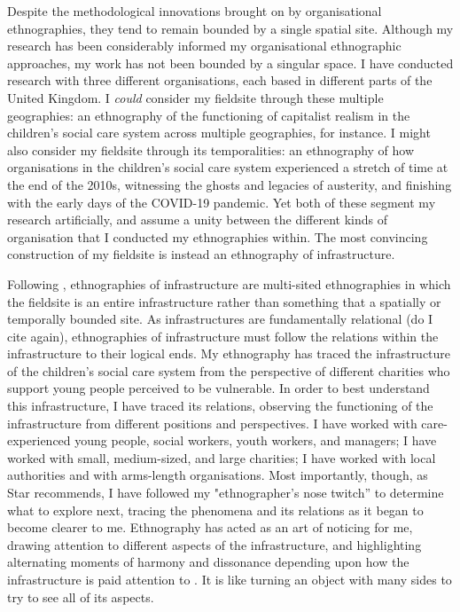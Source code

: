 Despite the methodological innovations brought on by organisational ethnographies, they tend to remain bounded by a single spatial site. Although my research has been considerably informed my organisational ethnographic approaches, my work has not been bounded by a singular space. I have conducted research with three different organisations, each based in different parts of the United Kingdom. I \textit{could} consider my fieldsite through these multiple geographies: an ethnography of the functioning of capitalist realism in the children's social care system across multiple geographies, for instance. I might also consider my fieldsite through its temporalities: an ethnography of how organisations in the children's social care system experienced a stretch of time at the end of the 2010s, witnessing the ghosts and legacies of austerity, and finishing with the early days of the COVID-19 pandemic. Yet both of these segment my research artificially, and assume a unity between the different kinds of organisation that I conducted my ethnographies within. The most convincing construction of my fieldsite is instead an ethnography of infrastructure. 

Following \cite{star_ethnography_1999}, ethnographies of infrastructure are multi-sited ethnographies in which the fieldsite is an entire infrastructure rather than something that a spatially or temporally bounded site. As infrastructures are fundamentally relational (do I cite again), ethnographies of infrastructure must follow the relations within the infrastructure to their logical ends. My ethnography has traced the infrastructure of the children’s social care system from the perspective of different charities who support young people perceived to be vulnerable. In order to best understand this infrastructure, I have traced its relations, observing the functioning of the infrastructure from different positions and perspectives. I have worked with care-experienced young people, social workers, youth workers, and managers; I have worked with small, medium-sized, and large charities; I have worked with local authorities and with arms-length organisations. Most importantly, though, as Star recommends, I have followed my "ethnographer’s nose twitch” \citep{leigh_star_this_2010} to determine what to explore next, tracing the phenomena and its relations as it began to become clearer to me. Ethnography has acted as an art of noticing for me, drawing attention to different aspects of the infrastructure, and highlighting alternating moments of harmony and dissonance depending upon how the infrastructure is paid attention to \citep[24]{tsing_mushroom_2017}. It is like turning an object with many sides to try to see all of its aspects.  

